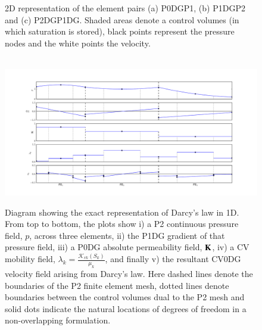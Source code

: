 \begin{figure}[h]
{%
}

  \caption{2D representation of the element pairs (a) P0DGP1, (b) P1DGP2  and (c) P2DGP1DG. Shaded areas denote a control volumes (in which saturation is stored), black points represent the pressure nodes and the white points the velocity.}
  \label{fem_cv_represent_a}
\end{figure}



\begin{figure}[htp]
\begin{center}
\hbox{\hspace{-2.cm}
\includegraphics[width=1.3\textwidth,height=1.3\textwidth]{diagrams/overlapping_cartoon}}
\vspace{-1.4cm}
\caption{Diagram showing the exact representation of Darcy's law in 1D. From top to bottom, the plots show i) a P2 continuous pressure field, $p$, across three elements, ii) the P1DG gradient of that  pressure field, iii) a P0DG absolute permeability field, ${\bf K}$, iv) a CV mobility field, $\lambda_{k}=\frac{\mathcal{K}_{rk}\left(S_{k}\right)}{\mu_{k}}$, and finally v) the resultant CV0DG velocity field arising from Darcy's law. Here dashed lines denote the boundaries of the P2 finite element mesh, dotted lines denote boundaries between the control volumes dual to the P2 mesh and solid dots indicate the natural locations of degrees of freedom in a non-overlapping formulation. }
\label{fig:darcys_law}
\end{center}
\end{figure}

